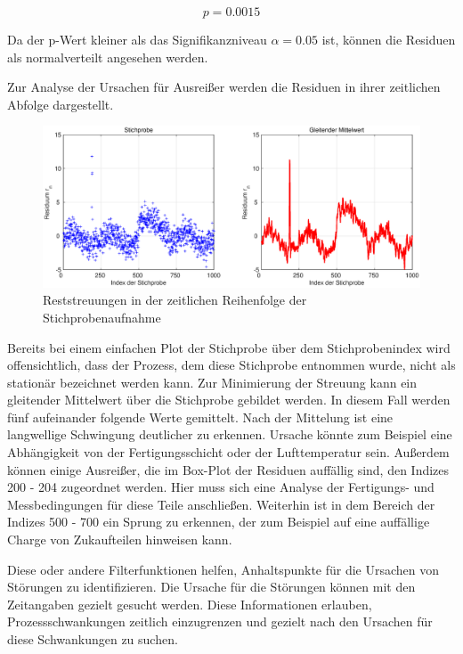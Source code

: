 \begin{equation}\label{eq:twelveonehundredthirtyfour}
p= 0.0015
\end{equation}

\noindent Da der p-Wert kleiner als das Signifikanzniveau $\alpha = 0.05$ ist, k\"{o}nnen die Residuen als normalverteilt angesehen werden.\newline

\noindent Zur Analyse der Ursachen f\"{u}r Ausrei{\ss}er werden die Residuen in ihrer zeitlichen Abfolge dargestellt. 

\noindent 
\begin{figure}[H]
  \centerline{\includegraphics[width=1\textwidth]{Kapitel12/Bilder/image16}}
  \caption{Reststreuungen in der zeitlichen Reihenfolge der Stichprobenaufnahme}
  \label{fig:Residuenanalyse3}
\end{figure}

\noindent Bereits bei einem einfachen Plot der Stichprobe \"{u}ber dem Stichprobenindex wird offensichtlich, dass der Prozess, dem diese Stichprobe entnommen wurde, nicht als station\"{a}r bezeichnet werden kann. Zur Minimierung der Streuung kann ein gleitender Mittelwert \"{u}ber die Stichprobe gebildet werden. In diesem Fall werden f\"{u}nf aufeinander folgende Werte gemittelt. Nach der Mittelung ist eine langwellige Schwingung deutlicher zu erkennen. Ursache k\"{o}nnte zum Beispiel eine Abh\"{a}ngigkeit von der Fertigungsschicht oder der Lufttemperatur sein. Au{\ss}erdem k\"{o}nnen einige Ausrei{\ss}er, die im Box-Plot der Residuen auff\"{a}llig sind, den Indizes 200 - 204 zugeordnet werden. Hier muss sich eine Analyse der Fertigungs- und Messbedingungen f\"{u}r diese Teile anschlie{\ss}en. Weiterhin ist in dem Bereich der Indizes 500 - 700 ein Sprung zu erkennen, der zum Beispiel auf eine auff\"{a}llige Charge von Zukaufteilen hinweisen kann.\newline

\noindent Diese oder andere Filterfunktionen helfen, Anhaltspunkte f\"{u}r die Ursachen von St\"{o}rungen zu identifizieren. Die Ursache f\"{u}r die St\"{o}rungen k\"{o}nnen mit den Zeitangaben gezielt gesucht werden. Diese Informationen erlauben, Prozessschwankungen zeitlich einzugrenzen und gezielt nach den Ursachen f\"{u}r diese Schwankungen zu suchen.\newline

